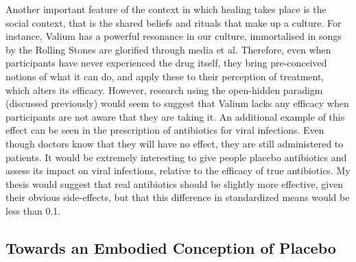Another important feature of the context in which healing takes place is the social context, that is the shared beliefs and rituals that make up a culture. For instance, Valium has a powerful resonance in our culture, immortalised in songs by the Rolling Stones are glorified through media et al. Therefore, even when participants have never experienced the drug itself, they bring pre-conceived notions of what it can do, and apply these to their perception of treatment, which alters its efficacy. However, research using the open-hidden paradigm (discussed previously) would seem to suggest that Valium lacks any efficacy when participants are not aware that they are taking it. An additional example of this effect can be seen in the prescription of antibiotics for viral infections. Even though doctors know that they will have no effect, they are still administered to patients. It would be extremely interesting to give people placebo antibiotics and assess its impact on viral infections, relative to the efficacy of true antibiotics. My thesis would suggest that real antibiotics should be slightly more effective, given their obvious side-effects, but that this difference in standardized means would be less than 0.1. 


\subsection{Towards an Embodied Conception of Placebo}

